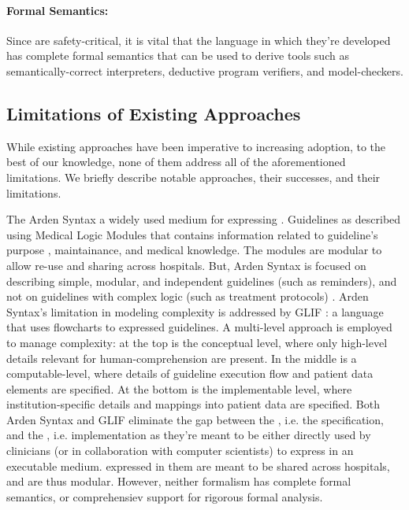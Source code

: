 \paragraph{Formal Semantics:}

Since \CIGs{} are safety-critical, it is vital that the
language in which they're developed has complete formal semantics that
can be used to derive tools such as semantically-correct interpreters,
deductive program verifiers, and model-checkers.

\subsection{Limitations of Existing Approaches}

While existing approaches have been imperative to increasing \CGS{} adoption, to the
best of our knowledge, none of them address all of the aforementioned
limitations. We briefly describe notable approaches, their successes, and their limitations.

The Arden Syntax \cite{HripcsakCBM94} a widely used medium for
expressing \CIGs{}.  Guidelines as described using Medical
Logic Modules that contains information related to guideline's purpose
, maintainance, and medical knowledge. The modules are modular to allow
re-use and sharing across hospitals. But, Arden Syntax
is focused on describing simple, modular, and independent
guidelines (such as reminders), and not on guidelines with complex logic (such
as treatment protocols) \cite{PelegJBI01}.
Arden Syntax's limitation in modeling complexity is addressed by
GLIF \cite{BoxwalaJBI04}: a language that uses flowcharts to expressed
guidelines. A multi-level approach is
employed to manage complexity: at the top is the conceptual level, where
only high-level details relevant for human-comprehension are present. In the
middle is a computable-level, where details of guideline execution flow
and patient data elements are specified. At the bottom is the implementable
level, where institution-specific details and mappings into patient data are
specified. Both Arden Syntax and GLIF  eliminate
the gap between the \BPG{}, i.e. the specification, and the \CIG{}, i.e. implementation as
they're meant to be either directly used by clinicians (or in collaboration with
computer scientists) to express \BPGs{} in an executable medium. \CIGs{}
expressed in them are meant to be shared across hospitals, and are thus modular.
However, neither formalism has complete formal semantics, or comprehensiev support for
rigorous formal analysis.

